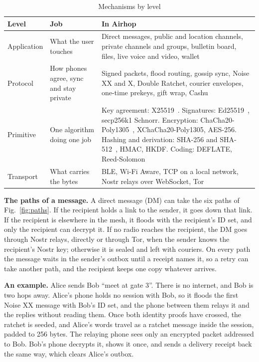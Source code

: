 \documentclass[conference]{IEEEtran}
\begin{document}
\begin{table}[t]
\caption{Mechanisms by level}
\label{tab:layers}
\centering
\scriptsize
\begin{tabular}{@{}L{1.25cm}L{1.9cm}L{4.6cm}@{}}
\toprule
Level & Job & In Airhop \\
\midrule
Application & What the user touches & Direct messages, public and location channels, private channels and groups, bulletin board, files, live voice and video, wallet \\
Protocol & How phones agree, sync and stay private & Signed packets, flood routing, gossip sync, Noise XX and X, Double Ratchet, courier envelopes, one-time prekeys, gift wrap, Cashu \\
Primitive & One algorithm doing one job & Key agreement: X25519~\cite{rfc7748}. Signatures: Ed25519~\cite{rfc8032}, secp256k1 Schnorr. Encryption: ChaCha20-Poly1305~\cite{rfc8439}, XChaCha20-Poly1305, AES-256. Hashing and derivation: SHA-256 and SHA-512~\cite{fips180_4}, HMAC, HKDF. Coding: DEFLATE, Reed-Solomon \\
Transport & What carries the bytes & BLE, Wi-Fi Aware, TCP on a local network, Nostr relays over WebSocket, Tor \\
\bottomrule
\end{tabular}
\end{table}

\textbf{The paths of a message.} A direct message (DM) can take the six paths of Fig.~\ref{fig:paths}. If the recipient holds a link to the sender, it goes down that link. If the recipient is elsewhere in the mesh, it floods with the recipient's ID set, and only the recipient can decrypt it. If no radio reaches the recipient, the DM goes through Nostr relays, directly or through Tor, when the sender knows the recipient's Nostr key; otherwise it is sealed and left with couriers. On every path the message waits in the sender's outbox until a receipt names it, so a retry can take another path, and the recipient keeps one copy whatever arrives.

\textbf{An example.} Alice sends Bob ``meet at gate 3''. There is no internet, and Bob is two hops away. Alice's phone holds no session with Bob, so it floods the first Noise XX message with Bob's ID set, and the phone between them relays it and the replies without reading them. Once both identity proofs have crossed, the ratchet is seeded, and Alice's words travel as a ratchet message inside the session, padded to 256 bytes. The relaying phone sees only an encrypted packet addressed to Bob. Bob's phone decrypts it, shows it once, and sends a delivery receipt back the same way, which clears Alice's outbox.
\end{document}

